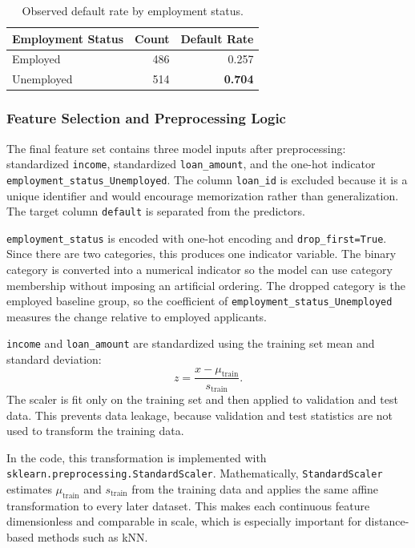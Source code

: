 \documentclass[12pt]{article}
\newcommand{\best}[1]{\textbf{#1}}
\begin{document}
\begin{table}[htbp]
\centering
\caption{Observed default rate by employment status.}
\begin{tabular}{lrr}
\toprule
Employment Status & Count & Default Rate \\
\midrule
Employed & 486 & 0.257 \\
Unemployed & 514 & \best{0.704} \\
\bottomrule
\end{tabular}
\end{table}

\subsubsection{Feature Selection and Preprocessing Logic}

The final feature set contains three model inputs after preprocessing: standardized \texttt{income}, standardized \texttt{loan\_amount}, and the one-hot indicator \texttt{employment\_status\_Unemployed}. The column \texttt{loan\_id} is excluded because it is a unique identifier and would encourage memorization rather than generalization. The target column \texttt{default} is separated from the predictors.

\texttt{employment\_status} is encoded with one-hot encoding and \texttt{drop\_first=True}. Since there are two categories, this produces one indicator variable. The binary category is converted into a numerical indicator so the model can use category membership without imposing an artificial ordering. The dropped category is the employed baseline group, so the coefficient of \texttt{employment\_status\_Unemployed} measures the change relative to employed applicants.

\texttt{income} and \texttt{loan\_amount} are standardized using the training set mean and standard deviation:
\[
    z = \frac{x-\mu_{\text{train}}}{s_{\text{train}}}.
\]
The scaler is fit only on the training set and then applied to validation and test data. This prevents data leakage, because validation and test statistics are not used to transform the training data.

In the code, this transformation is implemented with \texttt{sklearn.preprocessing.StandardScaler}. Mathematically, \texttt{StandardScaler} estimates $\mu_{\text{train}}$ and $s_{\text{train}}$ from the training data and applies the same affine transformation to every later dataset. This makes each continuous feature dimensionless and comparable in scale, which is especially important for distance-based methods such as kNN.
\end{document}
